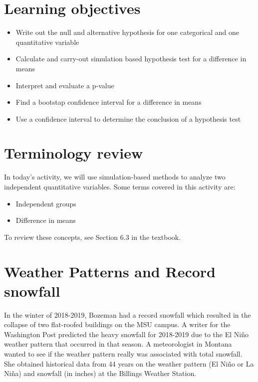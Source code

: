 \documentclass[
]{report}
\begin{document}
\hypertarget{learning-objectives}{%
\section{Learning objectives}\label{learning-objectives}}

\begin{itemize}
\item
  Write out the null and alternative hypothesis for one categorical and one quantitative variable
\item
  Calculate and carry-out simulation based hypothesis test for a difference in means
\item
  Interpret and evaluate a p-value
\item
  Find a bootstap confidence interval for a difference in means
\item
  Use a confidence interval to determine the conclusion of a hypothesis test
\end{itemize}

\hypertarget{terminology-review}{%
\section{Terminology review}\label{terminology-review}}

In today's activity, we will use simulation-based methods to analyze two independent quantitative variables. Some terms covered in this activity are:

\begin{itemize}
\item
  Independent groups
\item
  Difference in means
\end{itemize}

To review these concepts, see Section 6.3 in the textbook.

\hypertarget{weather-patterns-and-record-snowfall-1}{%
\section{Weather Patterns and Record snowfall}\label{weather-patterns-and-record-snowfall-1}}

In the winter of 2018-2019, Bozeman had a record snowfall which resulted in the collapse of two flat-roofed buildings on the MSU campus. A writer for the Washington Post predicted the heavy snowfall for 2018-2019 due to the El Ni\~{n}o weather pattern that occurred in that season. A meteorologist in Montana wanted to see if the weather pattern really was associated with total snowfall. She obtained historical data from 44 years on the weather pattern (El Ni\~{n}o or La Ni\~{n}a) and snowfall (in inches) at the Billings Weather Station.
\end{document}
